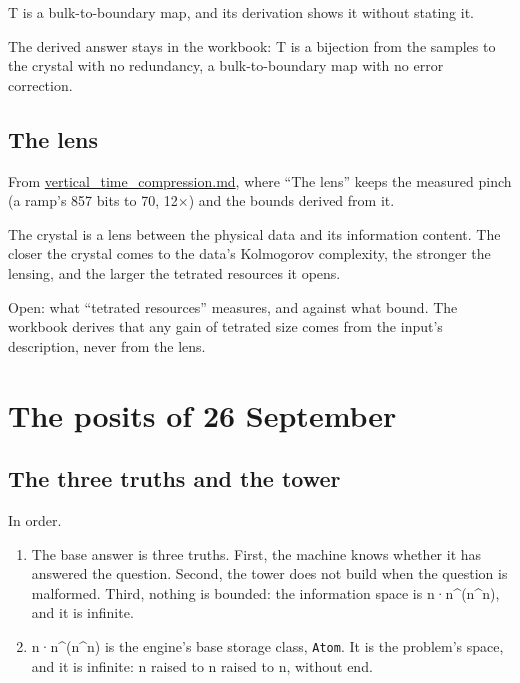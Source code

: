 T is a bulk-to-boundary map, and its derivation shows it without stating it.

The derived answer stays in the workbook: T is a bijection from the samples to the crystal with no redundancy, a bulk-to-boundary map with no error correction.

\subsection{\texorpdfstring{The lens}{The lens}}

From \hyperref[chap:vertical-time-compression]{vertical\_\allowbreak{}time\_\allowbreak{}compression.md}, where “The lens” keeps the measured pinch (a ramp's 857 bits to 70, 12×) and the bounds derived from it.

The crystal is a lens between the physical data and its information content. The closer the crystal comes to the data's Kolmogorov complexity, the stronger the lensing, and the larger the tetrated resources it opens.

Open: what “tetrated resources” measures, and against what bound. The workbook derives that any gain of tetrated size comes from the input's description, never from the lens.

\section{\texorpdfstring{The posits of 26 September}{The posits of 26 September}}

\subsection{\texorpdfstring{The three truths and the tower}{The three truths and the tower}}

In order.

\begin{enumerate}
\item The base answer is three truths. First, the machine knows whether it has answered the question. Second, the tower does not build when the question is malformed. Third, nothing is bounded: the information space is n·n\textasciicircum{}(n\textasciicircum{}n), and it is infinite.
\item n·n\textasciicircum{}(n\textasciicircum{}n) is the engine's base storage class, \texttt{Atom}. It is the problem's space, and it is infinite: n raised to n raised to n, without end.
\end{enumerate}


